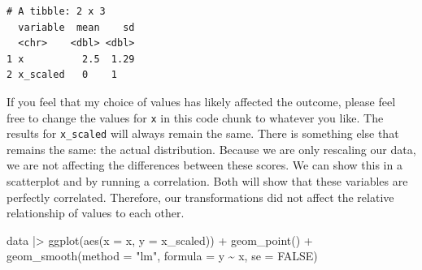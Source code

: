 \documentclass[
  letterpaper,
]{krantz}
\makeatletter
\newenvironment{Shaded}{\begin{snugshade}}{\end{snugshade}}
\newcommand{\AttributeTok}[1]{\textcolor[rgb]{0.40,0.45,0.13}{#1}}
\newcommand{\CommentTok}[1]{\textcolor[rgb]{0.37,0.37,0.37}{#1}}
\newcommand{\ConstantTok}[1]{\textcolor[rgb]{0.56,0.35,0.01}{#1}}
\newcommand{\DecValTok}[1]{\textcolor[rgb]{0.68,0.00,0.00}{#1}}
\newcommand{\FunctionTok}[1]{\textcolor[rgb]{0.28,0.35,0.67}{#1}}
\newcommand{\NormalTok}[1]{\textcolor[rgb]{0.00,0.23,0.31}{#1}}
\newcommand{\OtherTok}[1]{\textcolor[rgb]{0.00,0.23,0.31}{#1}}
\newcommand{\SpecialCharTok}[1]{\textcolor[rgb]{0.37,0.37,0.37}{#1}}
\newcommand{\StringTok}[1]{\textcolor[rgb]{0.13,0.47,0.30}{#1}}
\newenvironment{kframe}{%
\medskip{}
\setlength{\fboxsep}{.8em}
 \def\at@end@of@kframe{}%
 \ifinner\ifhmode%
  \def\at@end@of@kframe{\end{minipage}}%
  \begin{minipage}{\columnwidth}%
 \fi\fi%
 \def\FrameCommand##1{\hskip\@totalleftmargin \hskip-\fboxsep
 \colorbox{shadecolor}{##1}\hskip-\fboxsep
     \hskip-\linewidth \hskip-\@totalleftmargin \hskip\columnwidth}%
 \MakeFramed {\advance\hsize-\width
   \@totalleftmargin\z@ \linewidth\hsize
   \@setminipage}}%
 {\par\unskip\endMakeFramed%
 \at@end@of@kframe}
\renewenvironment{Shaded}{\begin{kframe}}{\end{kframe}}
\makeatother
\begin{document}
\begin{Shaded}
\end{Shaded}

\begin{verbatim}
# A tibble: 2 x 3
  variable  mean    sd
  <chr>    <dbl> <dbl>
1 x          2.5  1.29
2 x_scaled   0    1   
\end{verbatim}

If you feel that my choice of values has likely affected the outcome,
please feel free to change the values for \texttt{x} in this code chunk
to whatever you like. The results for \texttt{x\_scaled} will always
remain the same. There is something else that remains the same: the
actual distribution. Because we are only rescaling our data, we are not
affecting the differences between these scores. We can show this in a
scatterplot and by running a correlation. Both will show that these
variables are perfectly correlated. Therefore, our transformations did
not affect the relative relationship of values to each other.

\begin{Shaded}
\begin{Highlighting}[]
\NormalTok{data }\SpecialCharTok{|\textgreater{}}
  \FunctionTok{ggplot}\NormalTok{(}\FunctionTok{aes}\NormalTok{(}\AttributeTok{x =}\NormalTok{ x,}
             \AttributeTok{y =}\NormalTok{ x\_scaled)) }\SpecialCharTok{+}
  \FunctionTok{geom\_point}\NormalTok{() }\SpecialCharTok{+}
  \FunctionTok{geom\_smooth}\NormalTok{(}\AttributeTok{method =} \StringTok{"lm"}\NormalTok{,}
              \AttributeTok{formula =}\NormalTok{ y }\SpecialCharTok{\textasciitilde{}}\NormalTok{ x,}
              \AttributeTok{se =} \ConstantTok{FALSE}\NormalTok{)}
\end{Highlighting}
\end{Shaded}
\end{document}
